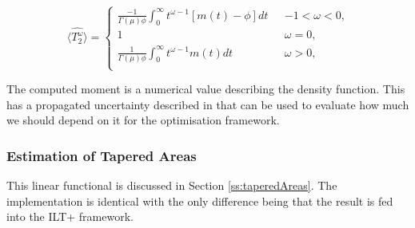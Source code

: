 \begin{equation}
\langle \hat{T_2^{\omega}}  \rangle =
\begin{cases}
        \frac{-1}{\Gamma (\mu) \phi}
        \int_{0}^{\infty}t^{\omega -1}[m(t) - \phi]dt &
        \text{ $-1<\omega<0$,}\\
        1 & \text{ $\omega=0$,}\\
        \frac{1}{\Gamma (\mu) \phi}
        \int_{0}^{\infty}t^{\omega -1}m(t)dt &
        \text{ $\omega>0$,}\\
\end{cases}
\label{eq:mellinTransform}
\end{equation}

The computed moment is a numerical value describing the density function. This has a propagated uncertainty described in \cite{VenkMellin2010} that can be used to evaluate how much we should depend on it for the optimisation framework.


\subsubsection{Estimation of Tapered Areas}
This linear functional is discussed in Section \ref{ss:taperedAreas}. The implementation is identical with the only difference being that the result is fed into the ILT+ framework.


